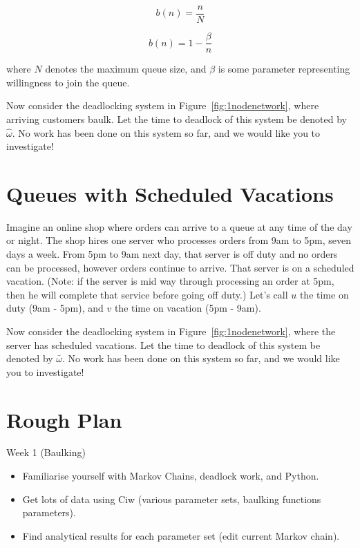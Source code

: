 \documentclass{article}
\begin{document}
\begin{equation*}
b(n) = \frac{n}{N}
\end{equation*}

\begin{equation*}
b(n) = 1 - \frac{\beta}{n}
\end{equation*}

where $N$ denotes the maximum queue size, and $\beta$ is some parameter representing willingness to join the queue.

Now consider the deadlocking system in Figure~\ref{fig:1nodenetwork}, where arriving customers baulk. Let the time to deadlock of this system be denoted by $\hat{\omega}$. No work has been done on this system so far, and we would like you to investigate!


\section{Queues with Scheduled Vacations}

Imagine an online shop where orders can arrive to a queue at any time of the day or night. The shop hires one server who processes orders from 9am to 5pm, seven days a week. From 5pm to 9am next day, that server is off duty and no orders can be processed, however orders continue to arrive. That server is on a scheduled vacation. (Note: if the server is mid way through processing an order at 5pm, then he will complete that service before going off duty.)
Let's call $u$ the time on duty (9am - 5pm), and $v$ the time on vacation (5pm - 9am).

Now consider the deadlocking system in Figure~\ref{fig:1nodenetwork}, where the server has scheduled vacations. Let the time to deadlock of this system be denoted by $\bar{\omega}$. No work has been done on this system so far, and we would like you to investigate!


\section{Rough Plan}

Week 1 (Baulking)

\begin{itemize}
	\item Familiarise yourself with Markov Chains, deadlock work, and Python.
	\item Get lots of data using Ciw (various parameter sets, baulking functions parameters).
	\item Find analytical results for each parameter set (edit current Markov chain).
\end{itemize}
\end{document}
